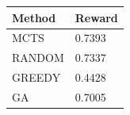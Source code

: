\begin{tabular}{ll}
\hline
Method & Reward \\
\hline
  MCTS & 0.7393 \\
  RANDOM & 0.7337 \\
  GREEDY & 0.4428 \\
  GA & 0.7005 \\
\hline
\end{tabular}
